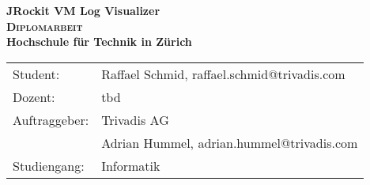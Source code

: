 \begin{titlepage}
   \begin{center}
    \huge \textbf{\textsf{JRockit VM Log Visualizer}} \\
    \vspace{2cm}
    \LARGE\textbf{\textsc{Diplomarbeit}}\\
    \vspace{4cm}
    \large \textbf{Hochschule f\"ur Technik in Z\"urich}\\
    \vspace{5cm}
    \end{center}
 \normalsize{
    \begin{tabular}{ll}
    	Student: &Raffael Schmid, raffael.schmid@trivadis.com\\
         Dozent: & tbd \\
	Auftraggeber: & Trivadis AG \\
	 & Adrian Hummel, adrian.hummel@trivadis.com\\
     	Studiengang: & Informatik\\
    \end{tabular}\\
    }
\end{titlepage}